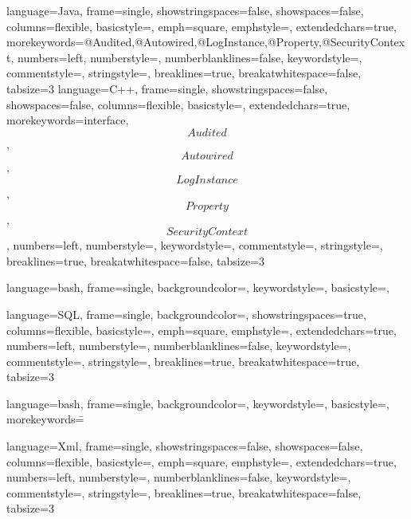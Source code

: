 

{
	language={Java},
	frame={single},
  showstringspaces={false},
	showspaces={false},
  columns={flexible},
  basicstyle={\footnotesize\ttfamily},
	emph={square},
	emphstyle={\color{blue}},
	extendedchars={true},
	morekeywords={@Audited,@Autowired,@LogInstance,@Property,@SecurityContext},
	numbers={left},
  numberstyle={\tiny\color{gray}},
	numberblanklines={false},
  keywordstyle={\color{violet}},
  commentstyle={\color{dkgreen}},
  stringstyle={\color{blue}},
  breaklines={true},
  breakatwhitespace={false},
  tabsize={3}
}
{
	language={C++},
	frame={single},
  showstringspaces={false},
	showspaces={false},
  columns={flexible},
  basicstyle={\footnotesize\ttfamily},
	extendedchars={true},
	morekeywords={interface,\[Audited\],\[Autowired\],\[LogInstance\],\[Property\],\[SecurityContext\]},
	numbers={left},
  numberstyle={\tiny\color{gray}},
  keywordstyle={\color{violet}},
  commentstyle={\color{dkgreen}},
  stringstyle={\color{blue}},
  breaklines={true},
  breakatwhitespace={false},
  tabsize={3}
}

{	language=bash,
	frame=single,
	backgroundcolor=\color{lightgrey},
	keywordstyle=\color{blue},
	basicstyle=\ttfamily,
}

{
	language={SQL},
	frame={single},
	backgroundcolor=\color{lightblue},
  showstringspaces={true},
  columns={flexible},
  basicstyle={\small\ttfamily},
	emph={square},
	emphstyle={\color{blue}},
	extendedchars={true},
	numbers={left},
  numberstyle={\tiny\color{gray}},
	numberblanklines={false},
  keywordstyle={\color{violet}},
  commentstyle={\color{dkgreen}},
  stringstyle={\color{blue}},
  breaklines={true},
  breakatwhitespace={true},
  tabsize={3}
}

{	language=bash,
	frame=single,
	backgroundcolor=\color{white},
	keywordstyle=\color{blue},
	basicstyle=\ttfamily,
	morekeywords={\=}
}

{
	language={Xml},
	frame={single},
  showstringspaces={false},
	showspaces={false},
  columns={flexible},
  basicstyle={\footnotesize\ttfamily},
	emph={square},
	emphstyle={\color{blue}},
	extendedchars={true},
	numbers={left},
  numberstyle={\tiny\color{gray}},
	numberblanklines={false},
  keywordstyle={\color{violet}},
  commentstyle={\color{dkgreen}},
  stringstyle={\color{blue}},
  breaklines={true},
  breakatwhitespace={false},
  tabsize={3}
}